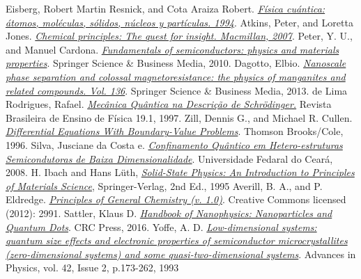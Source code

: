   Eisberg, Robert Martin Resnick, and Cota Araiza Robert. \href{http://gen.lib.rus.ec/book/index.php?md5=80CCC290E6FFF645ADF0BA24178E4C5D}{\it Física cuántica: átomos, moléculas, sólidos, núcleos y partículas. 1994}.
  Atkins, Peter, and Loretta Jones. \href{http://gen.lib.rus.ec/book/index.php?md5=6D32E94CECA0A9BD6FFF5F1307078071}{\it Chemical principles: The quest for insight. Macmillan, 2007}.
  Peter, Y. U., and Manuel Cardona. \href{http://gen.lib.rus.ec/book/index.php?md5=20A8507AB491C812ED2C75D08740987A}{\it Fundamentals of semiconductors: physics and materials properties}. Springer Science \& Business Media, 2010.
  Dagotto, Elbio. \href{http://gen.lib.rus.ec/book/index.php?md5=3C621FEBFE1EBBF8B376CED188D04A84}{\it Nanoscale phase separation and colossal magnetoresistance: the physics of manganites and related compounds. Vol. 136}. Springer Science \& Business Media, 2013.
  de Lima Rodrigues, Rafael. \href{http://sbfisica.org.br/rbef/pdf/v19_68.pdf}{\it Mecânica Quântica na Descrição de Schrödinger.} Revista Brasileira de Ensino de Física 19.1, 1997.
  Zill, Dennis G., and Michael R. Cullen. \href{http://gen.lib.rus.ec/book/index.php?md5=8673E58CC84FED5F909BEA1CC2BC4E3F}{\it Differential Equations With Boundary-Value Problems}. Thomson Brooks/Cole, 1996.
  Silva, Jusciane da Costa e. \href{www.repositorio.ufc.br/bitstream/riufc/12669/1/2008_tese_jcsilva.pdf}{\it Confinamento Quântico em Hetero-estruturas Semicondutoras de Baixa Dimensionalidade}. Universidade Fedaral do Ceará, 2008.
  H. Ibach and Hans Lüth, \href{http://www.springer.com/us/book/9783540938033}{\it Solid-State Physics: An Introduction to Principles of Materials Science}, Springer-Verlag, 2nd Ed., 1995
 Averill, B. A., and P. Eldredge. \href{https://2012books.lardbucket.org/books/principles-of-general-chemistry-v1.0m/index.html}{\it Principles of General Chemistry (v. 1.0)}. Creative Commons licensed (2012): 2991.
 Sattler, Klaus D. \href{https://www.amazon.com/Handbook-Nanophysics-Nanoparticles-Quantum-Dots-ebook/dp/B008I9VLAI}{\it Handbook of Nanophysics: Nanoparticles and Quantum Dots}. CRC Press, 2016.
 Yoffe, A. D. \href{http://adsabs.harvard.edu/abs/1993AdPhy..42..173Y}{\it Low-dimensional systems: quantum size effects and electronic properties of semiconductor microcrystallites (zero-dimensional systems) and some quasi-two-dimensional systems}. Advances in Physics, vol. 42, Issue 2, p.173-262, 1993
